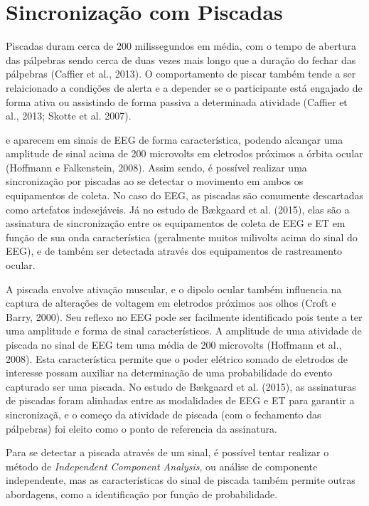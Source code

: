 \clearpage

\section{Sincronização com Piscadas}
Piscadas duram cerca de 200 milissegundos em média, com o tempo de abertura 
das pálpebras sendo cerca de duas vezes mais longo que a duração 
do fechar das pálpebras (Caffier et al., 2013). O comportamento de piscar também tende a 
ser relaicionado a condições de alerta e a depender se 
o participante está engajado de forma ativa ou assistindo de forma 
passiva a determinada atividade  (Caffier et al., 2013; Skotte et al. 2007). 


e aparecem em 
sinais de EEG de forma característica, 
podendo alcançar uma amplitude de sinal acima de 200 microvolts em eletrodos próximos a 
órbita ocular (Hoffmann e Falkenstein, 2008). Assim sendo, é possível realizar uma sincronização 
por piscadas ao se detectar o movimento em ambos os equipamentos de coleta. 
No caso do EEG, as piscadas são comumente descartadas como artefatos indesejáveis. 
Já no estudo de Bækgaard et al. (2015), elas são a assinatura de sincronização 
entre os equipamentos de coleta de EEG e ET em função de sua onda característica
 (geralmente muitos milivolts acima do sinal do EEG), e de também 
ser detectada através dos equipamentos de rastreamento ocular.






A piscada envolve ativação muscular, e o dipolo ocular também influencia na captura de alterações de voltagem em eletrodos próximos aos olhos
(Croft e Barry, 2000). Seu reflexo no EEG pode ser facilmente identificado pois tente a ter uma amplitude e forma de sinal característicos. 
A amplitude de uma atividade de piscada no sinal de EEG tem uma média de 200 microvolts (Hoffmann et al., 2008). Esta característica permite
que o poder elétrico somado de eletrodos de interesse possam auxiliar na determinação de uma probabilidade do evento capturado ser uma piscada. 
No estudo de Bækgaard et al. (2015), as assinaturas de piscadas foram alinhadas entre as modalidades de EEG e ET para garantir a sincronizaçã, e
o começo da atividade de piscada (com o fechamento das pálpebras) foi eleito como o ponto de referencia da assinatura. 


Para se detectar a piscada através de um sinal, é possível tentar realizar o método de \textit{Independent Component Analysis}, ou análise de 
componente independente, mas as características do sinal de piscada também permite outras abordagens, como a identificação por função de probabilidade.


